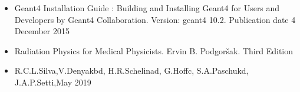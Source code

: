 \documentclass[a4paper,10pt]{article}
\begin{document}
\begin{itemize}
\item Geant4 Installation Guide : Building and Installing Geant4 for Users
and Developers by Geant4 Collaboration. Version: geant4 10.2. Publication date 4 December 2015

\item Radiation Physics for Medical Physicists. Ervin B. Podgoršak. Third Edition

\item R.C.L.Silva,V.Denyakbd, H.R.Schelinad, G.Hoffc, S.A.Paschukd, J.A.P.Setti,May 2019

\end{itemize}
\end{document}
